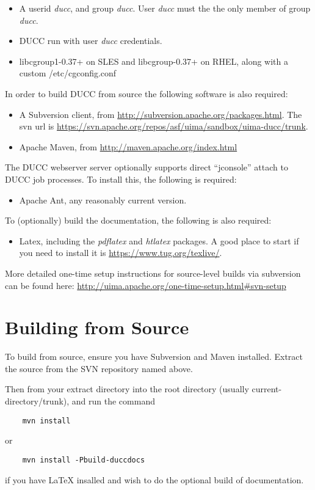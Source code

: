 \begin{itemize}
  \item A userid {\em ducc}, and group {\em ducc}.  User {\em ducc} must the the only member of group {\em ducc}.
  \item DUCC run with user {\em ducc} credentials.
  \item libcgroup1-0.37+ on SLES and libcgroup-0.37+ on RHEL, along with a custom /etc/cgconfig.conf
\end{itemize}

  
In order to build DUCC from source the following software is also required:
\begin{itemize}
    \item A Subversion client, from \url{http://subversion.apache.org/packages.html}.  The
      svn url is \url{https://svn.apache.org/repos/asf/uima/sandbox/uima-ducc/trunk}.
    \item Apache Maven, from \url{http://maven.apache.org/index.html}
\end{itemize}

The DUCC webserver server optionally supports direct ``jconsole'' attach to DUCC job processes.  To install
this, the following is required:
\begin{itemize}
    \item Apache Ant, any reasonably current version.
\end{itemize}
    
To (optionally) build the documentation, the following is also required:
\begin{itemize}
  \item Latex, including the \emph{pdflatex} and \emph{htlatex} packages.  A good place
    to start if you need to install it is \url{https://www.tug.org/texlive/}.
\end{itemize}

More detailed one-time setup instructions for source-level builds via subversion can be found here:
\url{http://uima.apache.org/one-time-setup.html\#svn-setup}

\section{Building from Source}

To build from source, ensure you have
Subversion and Maven installed.  Extract the source from the SVN repository named above. 

Then from your extract directory into
the root directory (usually current-directory/trunk), and run the command
\begin{verbatim}
    mvn install
\end{verbatim}
or
\begin{verbatim}
    mvn install -Pbuild-duccdocs
\end{verbatim}
if you have LaTeX insalled and wish to do the optional build of documentation.

